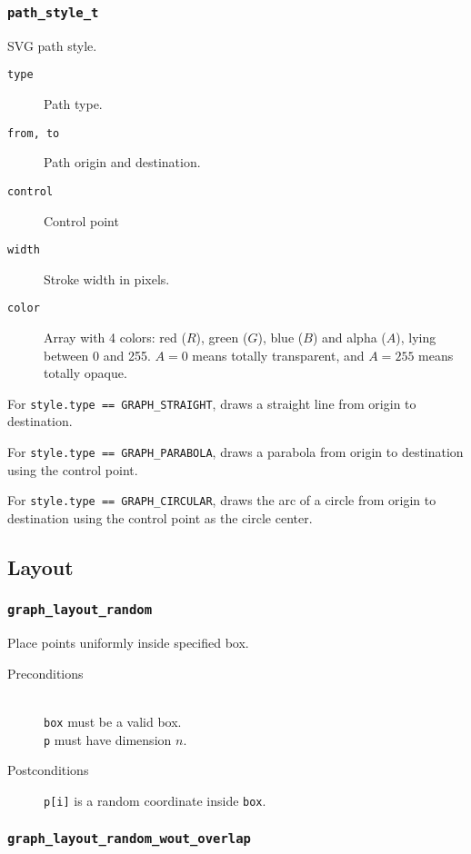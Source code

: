 \documentclass[a4paper,10pt]{article}
\begin{document}
\subsubsection{\texttt{path\_style\_t}}

SVG path style.

\begin{description}
 \item[\texttt{type}] Path type.
 \item[\texttt{from, to}] Path origin and destination.
 \item[\texttt{control}] Control point
 \item[\texttt{width}] Stroke width in pixels.
 \item[\texttt{color}] Array with 4 colors: red ($R$), green ($G$), blue ($B$) and 
  alpha ($A$), lying between 0 and 255. $A=0$ means totally transparent, and 
  $A = 255$ means totally opaque.
\end{description}

 For \texttt{style.type == GRAPH\_STRAIGHT}, draws a straight line from origin
 to destination.
 
 For \texttt{style.type == GRAPH\_PARABOLA}, draws a parabola from origin
 to destination using the control point.
 
 For \texttt{style.type == GRAPH\_CIRCULAR}, draws the arc of a circle from 
 origin to destination using the control point as the circle center.

\subsection{Layout}

\subsubsection{\texttt{graph\_layout\_random}}

Place points uniformly inside specified box.

\begin{description}
 \item[Preconditions]~\\
   \texttt{box} must be a valid box.\\
   \texttt{p} must have dimension $n$.
 \item[Postconditions] \texttt{p[i]} is a random coordinate inside \texttt{box}.
\end{description}

\subsubsection{\texttt{graph\_layout\_random\_wout\_overlap}}
\end{document}

